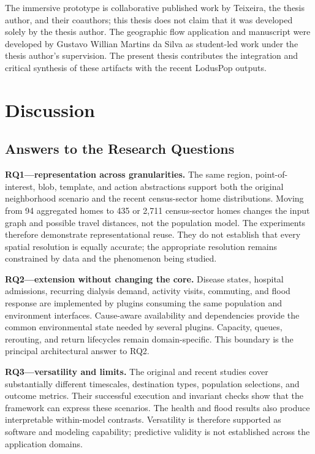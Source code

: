 \documentclass[pdflatex,sn-mathphys-num]{sn-jnl}%
\theoremstyle{thmstyleone}%
\theoremstyle{thmstyletwo}%
\theoremstyle{thmstylethree}%
\begin{document}
The immersive prototype is collaborative published work by Teixeira, the thesis author, and their coauthors; this thesis does not claim that it was developed solely by the thesis author. The geographic flow application and manuscript were developed by Gustavo Willian Martins da Silva as student-led work under the thesis author's supervision. The present thesis contributes the integration and critical synthesis of these artifacts with the recent LodusPop outputs.

\section{Discussion}
\label{sec:discussion}

\subsection{Answers to the Research Questions}
\label{discussion:questions}

\textbf{RQ1---representation across granularities.} The same region, point-of-interest, blob, template, and action abstractions support both the original neighborhood scenario and the recent census-sector home distributions. Moving from 94 aggregated homes to 435 or 2,711 census-sector homes changes the input graph and possible travel distances, not the population model. The experiments therefore demonstrate representational reuse. They do not establish that every spatial resolution is equally accurate; the appropriate resolution remains constrained by data and the phenomenon being studied.

\textbf{RQ2---extension without changing the core.} Disease states, hospital admissions, recurring dialysis demand, activity visits, commuting, and flood response are implemented by plugins consuming the same population and environment interfaces. Cause-aware availability and dependencies provide the common environmental state needed by several plugins. Capacity, queues, rerouting, and return lifecycles remain domain-specific. This boundary is the principal architectural answer to RQ2.

\textbf{RQ3---versatility and limits.} The original and recent studies cover substantially different timescales, destination types, population selections, and outcome metrics. Their successful execution and invariant checks show that the framework can express these scenarios. The health and flood results also produce interpretable within-model contrasts. Versatility is therefore supported as software and modeling capability; predictive validity is not established across the application domains.
\end{document}
